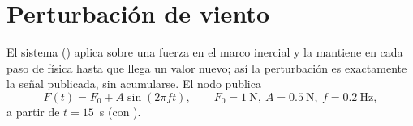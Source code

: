 \section{Perturbación de viento}

El sistema  () aplica sobre  una fuerza
en el marco inercial y la mantiene en cada paso de física hasta que llega un valor nuevo; así la
perturbación es exactamente la señal publicada, sin acumularse. El nodo  publica
\begin{equation}
F(t) = F_0 + A\sin(2\pi f t),\qquad F_0 = 1\ \text{N},\ A = 0.5\ \text{N},\ f = 0.2\ \text{Hz},
\end{equation}
a partir de $t = 15$~s (con ).

